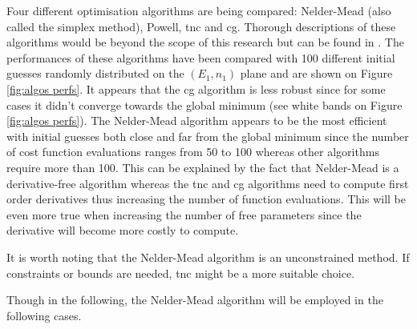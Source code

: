 Four different optimisation algorithms are being compared: 
Nelder-Mead (also called the simplex method), Powell, \gls{tnc} and \gls{cg}.
Thorough descriptions of these algorithms would be beyond the scope of this research but can be found in .
The performances of these algorithms have been compared with 100 different initial guesses randomly distributed on the $(E_1,n_1)$ plane and are shown on Figure \ref{fig:algos perfs}.
It appears that the \gls{cg} algorithm is less robust since for some cases it didn't converge towards the global minimum (see white bands on Figure \ref{fig:algos perfs}).
The Nelder-Mead algorithm appears to be the most efficient with initial guesses both close and far from the global minimum since the number of cost function evaluations ranges from 50 to 100 whereas other algorithms require more than 100.
This can be explained by the fact that Nelder-Mead is a derivative-free algorithm whereas the \gls{tnc} and \gls{cg} algorithms need to compute first order derivatives thus increasing the number of function evaluations.
This will be even more true when increasing the number of free parameters since the derivative will become more costly to compute.

It is worth noting that the Nelder-Mead algorithm is an unconstrained method.
If constraints or bounds are needed, \gls{tnc} might be a more suitable choice.

Though in the following, the Nelder-Mead algorithm will be employed in the following cases.
